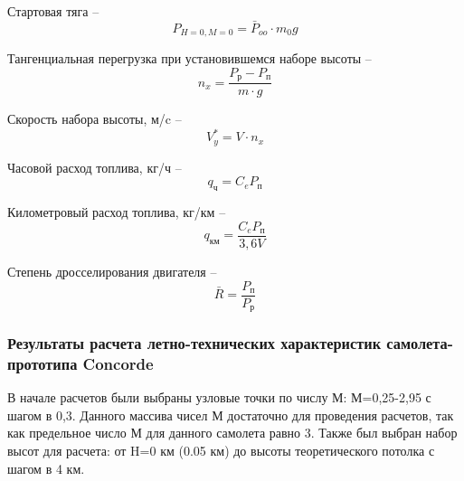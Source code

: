 Стартовая тяга --
\begin{equation}
    \label{eq:Стартовая тяга}
    P_{H=0,M=0} = \bar{P}_{oo} \cdot m_0g
\end{equation}

Тангенциальная перегрузка при установившемся наборе высоты -- 
\begin{equation}
    \label{eq:Тангенциальная перегрузка при установившемся наборе высоты}
    n_x = \frac{P_\text{р}-P_\text{п}}{m \cdot g}
\end{equation}

Скорость набора высоты, м/c --
\begin{equation}
    \label{eq:Скорость набора высоты}
    V^*_y = V \cdot n_x
\end{equation}

Часовой расход топлива, кг/ч -- 
\begin{equation}
    \label{eq:Часовой расход топлива}
    q_\text{ч} = C_e P_\text{п}
\end{equation}

Километровый расход топлива, кг/км -- 
\begin{equation}
    \label{eq:Километровый расход топлива}
    q_\text{км} = \frac{C_e P_\text{п}}{3,6V}
\end{equation}

Степень дросселирования двигателя -- 
\begin{equation}
    \label{eq:Степень дросселирования двигателя}
    \bar{R} = \frac{P_\text{п}}{P_\text{р}}
\end{equation}


\subsubsection{Результаты расчета летно-технических характеристик
самолета-прототипа Concorde}
\label{sec:Результаты расчета летно-технических характеристик
самолета-прототипа Concorde}

В начале расчетов были выбраны узловые точки по числу М: М=0,25-2,95 с шагом в 0,3. Данного массива чисел М достаточно для проведения расчетов, так как предельное число М для данного самолета равно 3. Также был выбран набор высот для расчета: от H=0 км (0.05 км) до высоты теоретического потолка с шагом в 4 км.










